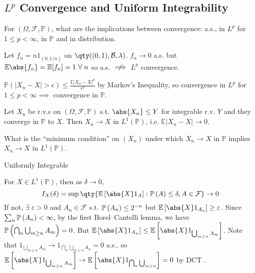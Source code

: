 \subsection{$L^p$ Convergence and Uniform Integrability}

For $(\Omega, \mathcal{F}, \mathbb{P})$, what are the implications between convergence: a.s., in $L^p$ for $1 \leq p < \infty$, in $\mathbb{P}$ and in distribution.

Let $f_n = n 1_{(0, 1/n)}$ on $\qty((0, 1), \mathcal{B}, \lambda)$.
$f_n \to 0$ a.s. but $\mathbb{E}\abs{f_n} = \mathbb{E}[f_n] = 1 \ \forall \; n$ so a.s. $\centernot\implies$ $L^p$ convergence.

$\mathbb{P}(|X_n - X| > \epsilon) \leq \frac{\mathbb{E}|X_n - X|^p}{\epsilon^p}$ by Markov's Inequality, so convergence in $L^p$ for $1 \leq p < \infty \implies$ convergence in $\mathbb{P}$.

\begin{theorem}
	Let $X_n$ be r.v.s on $(\Omega, \mathcal F, \mathbb P)$ s.t. $\abs{X_n} \leq Y$ for integrable r.v. $Y$ and they converge in $\mathbb{P}$ to $X$.
	Then $X_n \to X$ in $L^1(\mathbb P)$, i.e. $\mathbb{E}|X_n - X| \to 0$.
\end{theorem}

\begin{question}
	What is the ``minimum condition'' on $(X_n)$ under which $X_n \to X$ in $\mathbb{P}$ implies $X_n \to X$ in $L^1(\mathbb{P})$.
\end{question}

\begin{answer}
	Uniformly Integrable
\end{answer}


For $X \in L^1(\mathbb P)$, then as $\delta \to 0$,
\[ I_X(\delta) = \sup \qty{ \expect{\abs{X} 1_A} : \prob{A} \leq \delta, A \in \mathcal{F}} \to 0 \]
If not, $\exists \; \varepsilon > 0$ and $A_n \in \mathcal F$ s.t. $\mathbb{P}\left({A_n}\right) \leq 2^{-n}$ but $\expect{\abs{X} 1_{A_n}} \geq \varepsilon$.
Since $\sum_n \mathbb{P}\left({A_n}\right) < \infty$, by the first Borel--Cantelli lemma, we have $\mathbb{P}\left({\bigcap_n \bigcup_{m \geq n} A_m}\right) = 0$.
But $\expect{\abs{X} 1_{A_n}} \leq \expect{\abs{X} 1_{\bigcup_{m \geq n} A_m}}$.
Note that $1_{\bigcup_{m \geq n} A_m} \to 1_{\bigcap_n \bigcup_{m \geq n} A_n} = 0$ a.s., so $\expect{\abs{X} 1_{\bigcup_{m \geq n} A_m}} \to \expect{\abs{X} 1_{\bigcap_n \bigcup_{m \geq n}}} = 0$ by DCT \Lightning.

